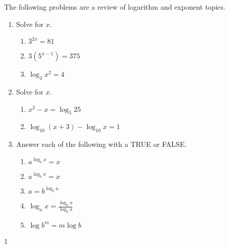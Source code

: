 \documentclass[9pt]{article}
\def\solutions{1}
\begin{document}
\item The following problems are a review of logarithm and exponent topics.

\begin{enumerate}

\item Solve for $x$.

	\begin{enumerate}
	\item $3^{2x} =  81 $
	\item $3(5^{x-1}) = 375 $
	\item $ \log_3 x^2  = 4  $
	\end{enumerate}


\item Solve for $x$.

	\begin{enumerate}
	\item $x^2 - x = \log_5 25 $
	\item $ \log_{10} (x+3) - \log_{10} x = 1 $
	\end{enumerate}

\item Answer each of the following with a TRUE or FALSE. 

	\begin{enumerate}
	\item $ a^{\log_a x} = x $
	\item $ a^{\log_b x} = x $
	\item $ a = b^{\log_b a} $
	\item $\log_a x = \frac{\log_b x}{\log_b a} $
	\item $\log b^m = m \log b $
	\end{enumerate}
	
\end{enumerate}

  \if\solutions1
  \vspace{2mm}
  
\end{document}
